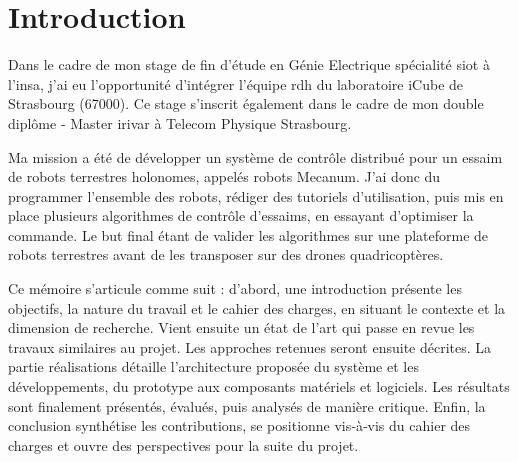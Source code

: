 \chapter{Introduction}

Dans le cadre de mon stage de fin d'étude en Génie Electrique spécialité \gls{siot} à l'\gls{insa}, j'ai eu l'opportunité d'intégrer l'équipe \gls{rdh} du laboratoire iCube de Strasbourg (67000). Ce stage s'inscrit également dans le cadre de mon double diplôme - Master \gls{irivar} à Telecom Physique Strasbourg.

Ma mission a été de développer un système de contrôle distribué pour un essaim de robots terrestres holonomes, appelés robots Mecanum. J'ai donc du programmer l'ensemble des robots, rédiger des tutoriels d'utilisation, puis mis en place plusieurs algorithmes de contrôle d'essaims, en essayant d'optimiser la commande. Le but final étant de valider les algorithmes sur une plateforme de robots terrestres avant de les transposer sur des drones quadricoptères.

Ce mémoire s’articule comme suit : d’abord, une introduction présente les objectifs, la nature du travail et le cahier des charges, en situant le contexte et la dimension de recherche. Vient ensuite un état de l’art qui passe en revue les travaux similaires au projet. Les approches retenues seront ensuite décrites.
La partie réalisations détaille l’architecture proposée du système et les développements, du prototype aux composants matériels et logiciels. Les résultats sont finalement présentés, évalués, puis analysés de manière critique.
Enfin, la conclusion synthétise les contributions, se positionne vis‑à‑vis du cahier des charges et ouvre des perspectives pour la suite du projet.






